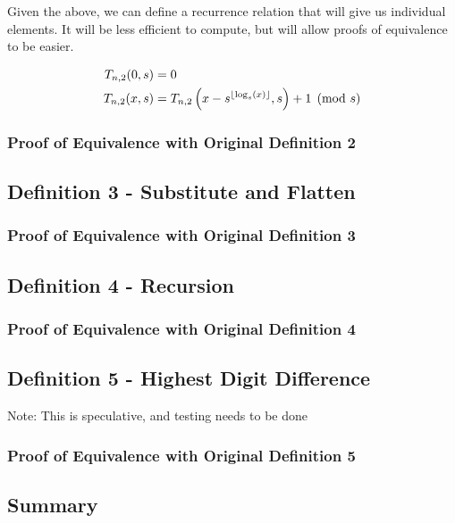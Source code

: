 \documentclass[conference]{IEEEtran}
\begin{document}
Given the above, we can define a recurrence relation that will give us individual elements. It will be less efficient to compute, but will allow proofs of equivalence to be easier.

\begin{equation}
    \begin{aligned}
        T_{n,2}(0, s) &= 0 \\
        T_{n,2}(x, s) &= T_{n,2}\left(x - s^{\left\lfloor \log_s(x) \right\rfloor}, s\right) + 1 \pmod{s}
    \end{aligned}
\end{equation}

\subsubsection{Proof of Equivalence with Original Definition 2}

\subsection{Definition 3 - Substitute and Flatten}

\subsubsection{Proof of Equivalence with Original Definition 3}

\subsection{Definition 4 - Recursion}

\subsubsection{Proof of Equivalence with Original Definition 4}

\subsection{Definition 5 - Highest Digit Difference}

Note: This is speculative, and testing needs to be done

\subsubsection{Proof of Equivalence with Original Definition 5}

\subsection{Summary}
\end{document}
